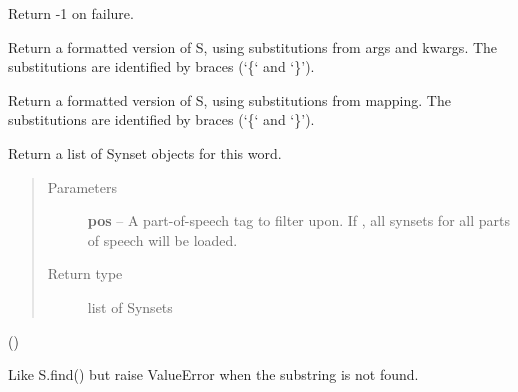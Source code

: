 \documentclass[letterpaper,10pt,english]{sphinxmanual}
\begin{document}
\begin{fulllineitems}
\begin{fulllineitems}
Return -1 on failure.

\end{fulllineitems}


\begin{fulllineitems}
\label{api_reference:textblob_de.blob.Word.format}
Return a formatted version of S, using substitutions from args and kwargs.
The substitutions are identified by braces (`\{` and `\}').

\end{fulllineitems}


\begin{fulllineitems}
\label{api_reference:textblob_de.blob.Word.format_map}
Return a formatted version of S, using substitutions from mapping.
The substitutions are identified by braces (`\{` and `\}').

\end{fulllineitems}


\begin{fulllineitems}
\label{api_reference:textblob_de.blob.Word.get_synsets}
Return a list of Synset objects for this word.
\begin{quote}\begin{description}
\item[{Parameters}] \leavevmode
\textbf{pos} -- A part-of-speech tag to filter upon. If , all
synsets for all parts of speech will be loaded.

\item[{Return type}] \leavevmode
list of Synsets

\end{description}\end{quote}

()

\end{fulllineitems}


\begin{fulllineitems}
\label{api_reference:textblob_de.blob.Word.index}
Like S.find() but raise ValueError when the substring is not found.


\end{fulllineitems}
\end{fulllineitems}
\end{document}
